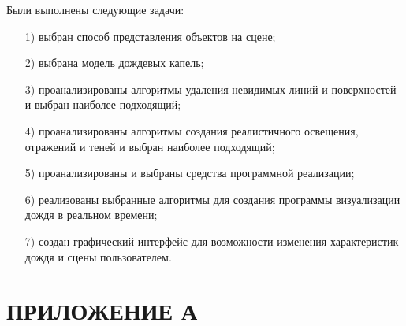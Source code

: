 Были выполнены следующие задачи:
\begin{enumerate}
\item[1)]
выбран способ представления объектов на сцене;
\item[2)]
выбрана модель дождевых капель;
\item[3)]
проанализированы алгоритмы удаления невидимых линий и поверхностей и выбран наиболее подходящий;
\item[4)]
проанализированы алгоритмы создания реалистичного освещения, отражений и теней и выбран наиболее подходящий;
\item[5)]
проанализированы и выбраны средства программной реализации;
\item[6)]
реализованы выбранные алгоритмы для создания программы визуализации дождя в реальном времени;
\item[7)]
создан графический интерфейс для возможности изменения характеристик дождя и сцены пользователем.
\end{enumerate}

{\centering \printbibliography[title=СПИСОК ИСПОЛЬЗОВАННЫХ ИСТОЧНИКОВ]}

{\centering \chapter*{ПРИЛОЖЕНИЕ А}}


